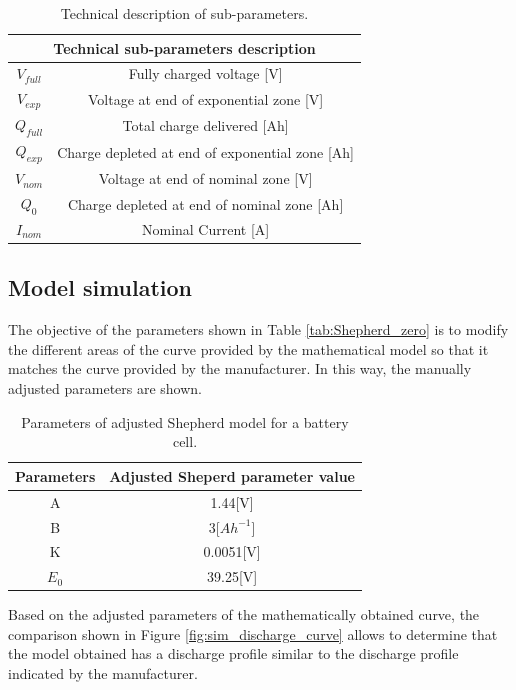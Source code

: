 \begin{table}[H]
	\centering
	\caption{Technical description of sub-parameters.}
	\label{tab:Shepherd_zero2}
	\begin{tabular}{|c|c|}
		\hline
		\multicolumn{2}{|c|}{\textbf{Technical sub-parameters description}} \\
		\hline\hline
		$V_{full}$ & Fully charged voltage [V]    \\
		\hline
		$V_{exp}$ & Voltage at end of exponential zone [V]   \\	
		\hline
		$Q_{full}$ & Total charge delivered [Ah]   \\	
		\hline
		$Q_{exp}$ & Charge depleted at end of exponential zone [Ah] \\	
		\hline
		$V_{nom}$ & Voltage at end of nominal zone [V] \\	
		\hline
		$Q_{0}$ & Charge depleted at end of nominal zone [Ah]\\	
		\hline
		$I_{nom}$ & Nominal Current [A]\\	
		\hline
		\end{tabular}
\end{table} 


\subsection{Model simulation}

The objective of the parameters shown in Table \ref{tab:Shepherd_zero} is to modify the different areas of the curve provided by the mathematical model so that it matches the curve provided by the manufacturer. In this way, the manually adjusted parameters are shown.

\begin{table}[H]
\centering
\caption{Parameters of adjusted Shepherd model for a battery cell.}
\label{tab:ParamsBatt}
\begin{tabular}{|c|c|}\hline
Parameters & Adjusted Sheperd parameter value\\ \hline \hline 
A & 1.44[V]\\
\hline
B & 3[$Ah^{-1}$]\\
\hline
K & 0.0051[V]\\
\hline
$E_0$ & 39.25[V]\\
\hline 
\end{tabular}
\end{table}

Based on the adjusted parameters of the mathematically obtained curve, the comparison shown in Figure \ref{fig:sim_discharge_curve} allows to determine that the model obtained has a discharge profile similar to the discharge profile indicated by the manufacturer.


